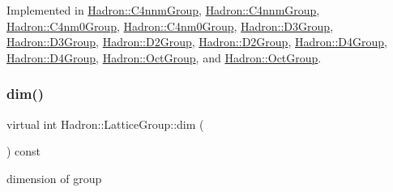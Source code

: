 Implemented in \mbox{\hyperlink{structHadron_1_1C4nnmGroup_a413031d9855013b22c493696c69a2c4d}{Hadron\+::\+C4nnm\+Group}}, \mbox{\hyperlink{structHadron_1_1C4nnmGroup_a413031d9855013b22c493696c69a2c4d}{Hadron\+::\+C4nnm\+Group}}, \mbox{\hyperlink{structHadron_1_1C4nm0Group_abac118ef8b96cecf62143c917e23736e}{Hadron\+::\+C4nm0\+Group}}, \mbox{\hyperlink{structHadron_1_1C4nm0Group_abac118ef8b96cecf62143c917e23736e}{Hadron\+::\+C4nm0\+Group}}, \mbox{\hyperlink{structHadron_1_1D3Group_a361cfe22330be972fe6d49bc2e1af871}{Hadron\+::\+D3\+Group}}, \mbox{\hyperlink{structHadron_1_1D3Group_a361cfe22330be972fe6d49bc2e1af871}{Hadron\+::\+D3\+Group}}, \mbox{\hyperlink{structHadron_1_1D2Group_a41bfcefe5a659b99db790f822123593f}{Hadron\+::\+D2\+Group}}, \mbox{\hyperlink{structHadron_1_1D2Group_a41bfcefe5a659b99db790f822123593f}{Hadron\+::\+D2\+Group}}, \mbox{\hyperlink{structHadron_1_1D4Group_ae7ebfa25f82987479c33f0d5d769ab2f}{Hadron\+::\+D4\+Group}}, \mbox{\hyperlink{structHadron_1_1D4Group_ae7ebfa25f82987479c33f0d5d769ab2f}{Hadron\+::\+D4\+Group}}, \mbox{\hyperlink{structHadron_1_1OctGroup_aeaabc93ad3df1b585bc1009b0bf4f5ba}{Hadron\+::\+Oct\+Group}}, and \mbox{\hyperlink{structHadron_1_1OctGroup_aeaabc93ad3df1b585bc1009b0bf4f5ba}{Hadron\+::\+Oct\+Group}}.

\mbox{\label{structHadron_1_1LatticeGroup_abd8415698323796ef6a8605796ee3bea}} 
\subsubsection{\texorpdfstring{dim()}{dim()}\hspace{0.1cm}{\footnotesize\ttfamily [1/2]}}
{\footnotesize\ttfamily virtual int Hadron\+::\+Lattice\+Group\+::dim (\begin{DoxyParamCaption}{ }\end{DoxyParamCaption}) const\hspace{0.3cm}{\ttfamily [pure virtual]}}

dimension of group 

